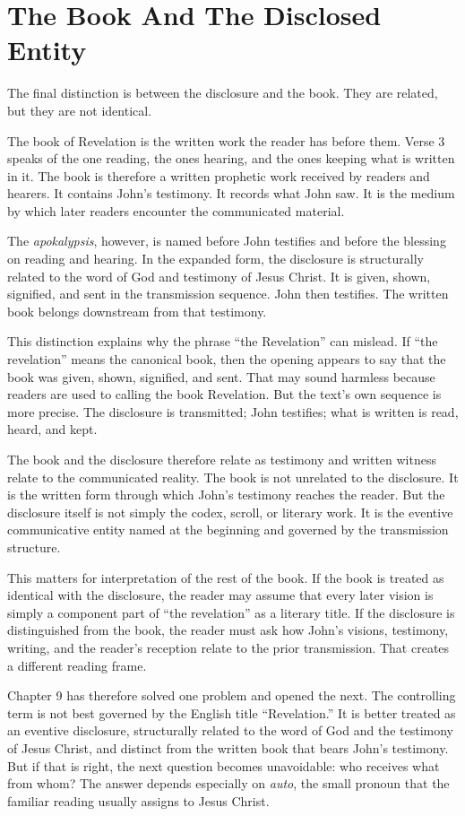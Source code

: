 \section{The Book And The Disclosed Entity}

The final distinction is between the disclosure and the book. They are related, but they are not identical.

The book of Revelation is the written work the reader has before them. Verse 3 speaks of the one reading, the ones hearing, and the ones keeping what is written in it. The book is therefore a written prophetic work received by readers and hearers. It contains John's testimony. It records what John saw. It is the medium by which later readers encounter the communicated material.

The \textit{apokalypsis}, however, is named before John testifies and before the blessing on reading and hearing. In the expanded form, the disclosure is structurally related to the word of God and testimony of Jesus Christ. It is given, shown, signified, and sent in the transmission sequence. John then testifies. The written book belongs downstream from that testimony.

This distinction explains why the phrase ``the Revelation'' can mislead. If ``the revelation'' means the canonical book, then the opening appears to say that the book was given, shown, signified, and sent. That may sound harmless because readers are used to calling the book Revelation. But the text's own sequence is more precise. The disclosure is transmitted; John testifies; what is written is read, heard, and kept.

The book and the disclosure therefore relate as testimony and written witness relate to the communicated reality. The book is not unrelated to the disclosure. It is the written form through which John's testimony reaches the reader. But the disclosure itself is not simply the codex, scroll, or literary work. It is the eventive communicative entity named at the beginning and governed by the transmission structure.

This matters for interpretation of the rest of the book. If the book is treated as identical with the disclosure, the reader may assume that every later vision is simply a component part of ``the revelation'' as a literary title. If the disclosure is distinguished from the book, the reader must ask how John's visions, testimony, writing, and the reader's reception relate to the prior transmission. That creates a different reading frame.

Chapter 9 has therefore solved one problem and opened the next. The controlling term is not best governed by the English title ``Revelation.'' It is better treated as an eventive disclosure, structurally related to the word of God and the testimony of Jesus Christ, and distinct from the written book that bears John's testimony. But if that is right, the next question becomes unavoidable: who receives what from whom? The answer depends especially on \textit{auto}, the small pronoun that the familiar reading usually assigns to Jesus Christ.
